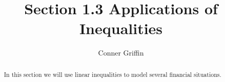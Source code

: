 \documentclass{ximera}
\title{Section 1.3 Applications of Inequalities}
\author{Conner Griffin}
\begin{document}
\begin{abstract}
    In this section we will use linear inequalities to model several financial situations.
\end{abstract}
\maketitle



\end{document}
